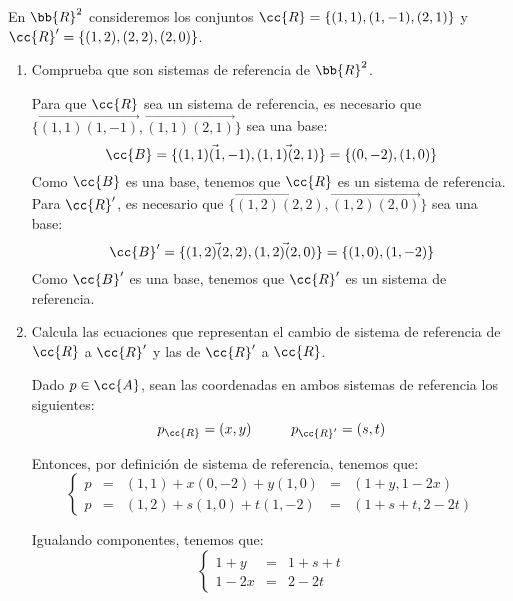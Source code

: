 \begin{ejercicio}
    En $\bb{R}^2$ consideremos los conjuntos $\cc{R} = \{(1, 1),(1, -1),(2, 1)\}$ y $\cc{R}' = \{(1, 2),(2, 2),(2, 0)\}$.
    \begin{enumerate}
        \item Comprueba que son sistemas de referencia de $\bb{R}^2$.

        Para que $\cc{R}$ sea un sistema de referencia, es necesario que $\{\vec{(1,1)(1,-1)}, \vec{(1,1)(2,1)}\}$ sea una base:
        \begin{equation*}
            \cc{B}=\{\vec{(1,1)(1,-1)}, \vec{(1,1)(2,1)}\}
            = \{{(0,-2)}, {(1,0)}\}
        \end{equation*}
        Como $\cc{B}$ es una base, tenemos que $\cc{R}$ es un sistema de referencia.\\
    
        Para $\cc{R}'$, es necesario que $\{\vec{(1,2)(2,2)}, \vec{(1,2)(2,0)}\}$ sea una base:
        \begin{equation*}
            \cc{B}'=\{\vec{(1,2)(2,2)}, \vec{(1,2)(2,0)}\}
            = \{{(1,0)}, {(1,-2)}\}
        \end{equation*}
        Como $\cc{B}'$ es una base, tenemos que $\cc{R}'$ es un sistema de referencia.
        
        \item  Calcula las ecuaciones que representan el cambio de sistema de referencia de $\cc{R}$ a $\cc{R}'$ y las de $\cc{R}'$ a $\cc{R}$.

        Dado $p\in \cc{A}$, sean las coordenadas en ambos sistemas de referencia los siguientes:
        \begin{equation*}
            p_{\cc{R}}=(x,y)\hspace{1cm}
            p_{\cc{R}'}=(s,t)
        \end{equation*}

        Entonces, por definición de sistema de referencia, tenemos que:
        \begin{equation*}
            \left\{
            \begin{array}{lllll}
                p&=&(1,1) +x(0,-2) + y(1,0) &=& (1+y, 1-2x) \\
                p&=&(1,2) +s(1,0) + t(1,-2) &=& (1+s+t, 2-2t)
            \end{array}
            \right.
        \end{equation*}

        Igualando componentes, tenemos que:
        \begin{equation*}
            \left\{
            \begin{array}{lll}
                1+y&=&1+s+t\\
                1-2x&=&2-2t
            \end{array}
            \right.
        \end{equation*}


\end{enumerate}
\end{ejercicio}
